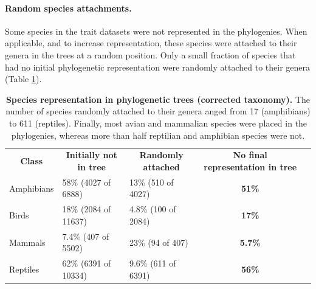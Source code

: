
\paragraph{Random species attachments.} Some species in the trait datasets were not represented in the phylogenies. When applicable, and to increase representation, these species were attached to their genera in the trees at a random position. Only a small fraction of species that had no initial phylogenetic representation were randomly attached to their genera (Table \ref{random_attachments_phy}).

\begin{table}[h!]
\renewcommand{\baselinestretch}{1}
\renewcommand{\arraystretch}{1.5}
\begin{center}\fontsize{9}{11}\selectfont
\caption[Species representation in phylogenetic trees (corrected taxonomy)]{\textbf{Species representation in phylogenetic trees (corrected taxonomy).} The number of species randomly attached to their genera anged from 17 (amphibians) to 611 (reptiles). Finally, most avian and mammalian species were placed in the phylogenies, whereas more than half reptilian and amphibian species were not.} 
\label{random_attachments_phy}
\begin{tabular}{|l|l|l|c|l}
\cline{1-4}
\multicolumn{1}{|c|}{\textbf{Class}} & \multicolumn{1}{c|}{\textbf{Initially not in tree}} & \multicolumn{1}{c|}{\textbf{Randomly attached}} & \textbf{No final representation in tree} &  \\ \cline{1-4}
Amphibians                  & 58\% (4027 of 6888)                           & 13\% (510 of 4027)                     & \textbf{51\%}             &  \\ \cline{1-4}
Birds                       & 18\% (2084 of 11637)                          & 4.8\% (100 of 2084)                    & \textbf{17\%}             &  \\ \cline{1-4}
Mammals                     & 7.4\% (407 of 5502)                           & 23\% (94 of 407)                       & \textbf{5.7\%}            &  \\ \cline{1-4}
Reptiles                    & 62\% (6391 of 10334)                          & 9.6\% (611 of 6391)                    & \textbf{56\%}             &  \\ \cline{1-4}
\end{tabular}
\end{center}
\end{table}

